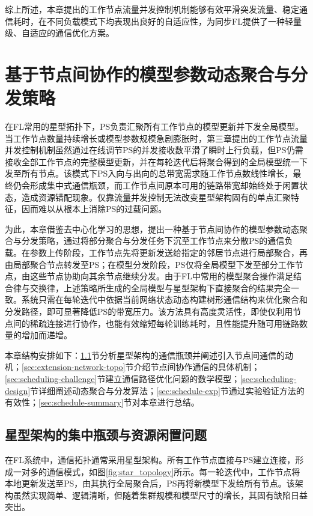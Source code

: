 \documentclass[master, vlined]{DissertUESTC}
\begin{document}
	综上所述，本章提出的工作节点流量并发控制机制能够有效平滑突发流量、稳定通信耗时，在不同负载模式下均表现出良好的自适应性，为同步FL提供了一种轻量级、自适应的通信优化方案。

	\chapter{基于节点间协作的模型参数动态聚合与分发策略}

	在FL常用的星型拓扑下，PS负责汇聚所有工作节点的模型更新并下发全局模型。当工作节点数量持续增长或模型参数规模急剧膨胀时，第三章提出的工作节点流量并发控制机制虽然通过在线调节PS的并发接收数平滑了瞬时上行负载，但PS仍需接收全部工作节点的完整模型更新，并在每轮迭代后将聚合得到的全局模型统一下发至所有节点。该模式下PS入向与出向的总带宽需求随工作节点数线性增长，最终仍会形成集中式通信瓶颈，而工作节点间原本可用的链路带宽却始终处于闲置状态，造成资源错配现象。仅靠流量并发控制无法改变星型架构固有的单点汇聚特征，因而难以从根本上消除PS的过载问题。

	为此，本章借鉴去中心化学习的思想，提出一种基于节点间协作的模型参数动态聚合与分发策略，通过将部分聚合与分发任务下沉至工作节点来分散PS的通信负载。在参数上传阶段，工作节点先将更新发送给指定的邻居节点进行局部聚合，再由局部聚合节点转发至PS；在模型分发阶段，PS仅将全局模型下发至部分工作节点，由这些节点协助向其余节点继续分发。由于FL中常用的模型聚合操作满足结合律与交换律，上述策略所生成的全局模型与星型架构下直接聚合的结果完全一致。系统只需在每轮迭代中依据当前网络状态动态构建树形通信结构来优化聚合和分发路径，即可显著降低PS的带宽压力。该方法具有高度灵活性，即使仅利用节点间的稀疏连接进行协作，也能有效缩短每轮训练耗时，且性能提升随可用链路数量的增加而递增。

	本章结构安排如下：\ref{sec:star-fl}节分析星型架构的通信瓶颈并阐述引入节点间通信的动机；\ref{sec:extension-network-topo}节介绍节点间协作通信的具体机制；\ref{sec:scheduling-challenge}节建立通信路径优化问题的数学模型；\ref{sec:scheduling-design}节详细阐述动态聚合与分发算法；\ref{sec:schedule-exp}节通过实验验证方法的有效性；\ref{sec:schedule-summary}节对本章进行总结。

	\section{星型架构的集中瓶颈与资源闲置问题}
	\label{sec:star-fl}

	在FL系统中，通信拓扑通常采用星型架构。所有工作节点直接与PS建立连接，形成一对多的通信模式，如图\ref{fig:star_topology}所示。每一轮迭代中，工作节点将本地更新发送至PS，由其执行全局聚合后，PS再将新模型下发给所有节点。该架构虽然实现简单、逻辑清晰，但随着集群规模和模型尺寸的增长，其固有缺陷日益突出。
\end{document}
